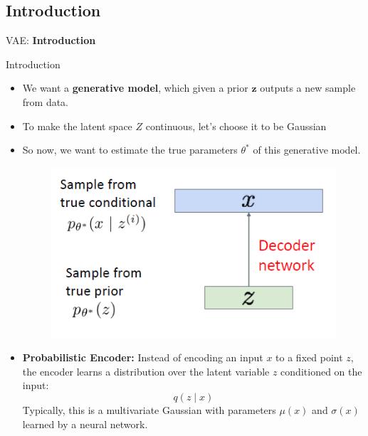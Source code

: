 \subsection{Introduction}
\begin{frame}{}
    \LARGE VAE: \textbf{Introduction}
\end{frame}


\begin{frame}[allowframebreaks]{Introduction}
  \begin{itemize}
    \item We want a \textbf{generative model}, which given a prior $\mathbf{z}$ outputs a new sample from data.
    \item To make the latent space $Z$ continuous, let's choose it to be Gaussian
    \item So now, we want to estimate the true parameters $\theta^*$ of this generative model.
    \begin{figure}
        \centering
        \includegraphics[height=0.5\textheight, width=\textwidth, keepaspectratio]{./images/vae/abstract_model.png}
    \end{figure}
\end{itemize}

\framebreak

\begin{itemize}
  \item \textbf{Probabilistic Encoder:} Instead of encoding an input \( x \) to a fixed point \( z \), the encoder learns a distribution over the latent variable \( z \) conditioned on the input:
  \[ q(z \mid x) \]
  Typically, this is a multivariate Gaussian with parameters \( \mu(x) \) and \( \sigma(x) \) learned by a neural network.

  \framebreak
  

\end{itemize}
\end{frame}
